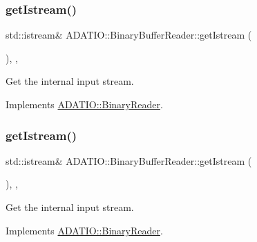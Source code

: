 \mbox{\label{classADATIO_1_1BinaryBufferReader_a32d746446a4c990f3c592a32753d7207}} 
\subsubsection{\texorpdfstring{getIstream()}{getIstream()}\hspace{0.1cm}{\footnotesize\ttfamily [1/2]}}
{\footnotesize\ttfamily std\+::istream\& A\+D\+A\+T\+I\+O\+::\+Binary\+Buffer\+Reader\+::get\+Istream (\begin{DoxyParamCaption}{ }\end{DoxyParamCaption})\hspace{0.3cm}{\ttfamily [inline]}, {\ttfamily [protected]}, {\ttfamily [virtual]}}



Get the internal input stream. 



Implements \mbox{\hyperlink{classADATIO_1_1BinaryReader_aa34e73d5f1e6b2b3b48c27e97f6a85a0}{A\+D\+A\+T\+I\+O\+::\+Binary\+Reader}}.

\mbox{\label{classADATIO_1_1BinaryBufferReader_a32d746446a4c990f3c592a32753d7207}} 
\subsubsection{\texorpdfstring{getIstream()}{getIstream()}\hspace{0.1cm}{\footnotesize\ttfamily [2/2]}}
{\footnotesize\ttfamily std\+::istream\& A\+D\+A\+T\+I\+O\+::\+Binary\+Buffer\+Reader\+::get\+Istream (\begin{DoxyParamCaption}{ }\end{DoxyParamCaption})\hspace{0.3cm}{\ttfamily [inline]}, {\ttfamily [protected]}, {\ttfamily [virtual]}}



Get the internal input stream. 



Implements \mbox{\hyperlink{classADATIO_1_1BinaryReader_aa34e73d5f1e6b2b3b48c27e97f6a85a0}{A\+D\+A\+T\+I\+O\+::\+Binary\+Reader}}.

